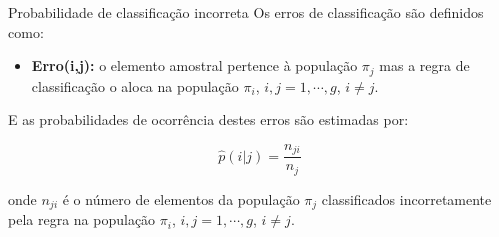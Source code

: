 \documentclass[
  ignorenonframetext,
  aspectratio=169,
]{beamer}
\providecommand{\tightlist}{%
  \setlength{\itemsep}{0pt}\setlength{\parskip}{0pt}}
\begin{document}
\begin{frame}{Probabilidade de classificação incorreta}
\label{probabilidade-de-classificauxe7uxe3o-incorreta-4}
Os erros de classificação são definidos como:

\begin{itemize}
\tightlist
\item
  \textbf{Erro(i,j):} o elemento amostral pertence à população \(\pi_j\)
  mas a regra de classificação o aloca na população \(\pi_i\),
  \(i,j = 1, \cdots, g\), \(i \neq j\).
\end{itemize}

\pause

E as probabilidades de ocorrência destes erros são estimadas por:

\[\widehat{p}(i|j) = \displaystyle{\frac{n_{ji}}{n_j}}\]

onde \(n_{ji}\) é o número de elementos da população \(\pi_j\)
classificados incorretamente pela regra na população \(\pi_i\),
\(i,j = 1, \cdots, g\), \(i \neq j\).
\end{frame}
\end{document}
